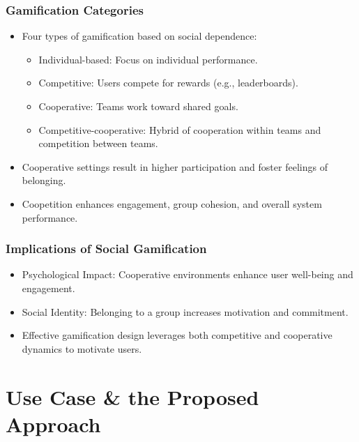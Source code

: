 \begin{frame}
    \frametitle{Gamification Categories}
    \begin{itemize}
        \item Four types of gamification based on \alert{social dependence}:
        \begin{itemize}
            \item Individual-based: Focus on individual performance.
            \item Competitive: Users compete for rewards (e.g., leaderboards).
            \item Cooperative: Teams work toward shared goals.
            \item Competitive-cooperative: Hybrid of cooperation within teams and competition between teams.
        \end{itemize}
        
        \item Cooperative settings result in higher participation and foster feelings of belonging.

        \item \alert{Coopetition} enhances engagement, group cohesion, and overall system performance.
    \end{itemize}
\end{frame}

\begin{frame}
    \frametitle{Implications of Social Gamification}
    \begin{itemize}
        \item Psychological Impact: Cooperative environments enhance user well-being and \alert{engagement}.
        \item Social Identity: Belonging to a group increases motivation and commitment.
        \item Effective gamification design leverages both competitive and cooperative dynamics to motivate users.
    \end{itemize}
\end{frame}

\section{Use Case \& the Proposed Approach}

